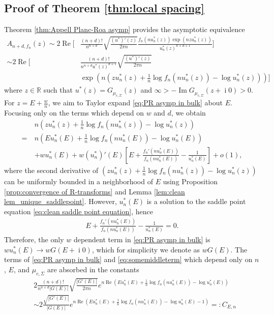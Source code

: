 \documentclass[reqno]{amsart}
\newcommand{\1}{\mathbf{1}}
\DeclareMathOperator{\ii}{i}
\renewcommand\Re{\operatorname{Re}}
\renewcommand\Im{\operatorname{Im}}
\newcommand{\R}{\mathbb{R}}
\def\R{\mathbb{R}}
\theoremstyle{plain}
\theoremstyle{definition}
\theoremstyle{remark}
\numberwithin{equation}{section}
\begin{document}
	\subsection{Proof of Theorem \ref{thm:local spacing}} Theorem \ref{thm:Appell Planc-Roa asymp} provides the asymptotic equivalence
		\begin{align}\label{eq:PR asymp in bulk}
		A_{n+d,f_n}(z)\sim 2\Re\bigg[&\frac{(n+d)!}{n^{n+d}}\sqrt{\frac{(u^*)'(z) }{2\pi n}}\frac{f_{n}\left(nu_n^*(z) \right)\exp\left(nzu_n^*(z) \right)}{u_n^*(z)^{n+d+1}}\bigg]\nonumber\\
		\sim 2\Re\bigg[&\frac{(n+d)!}{n^{n+d} u^*(z)^{d+1}}\sqrt{\frac{(u^*)'(z) }{2\pi n}}\nonumber\\
		&\exp\left(n\left(  zu_n^*(z)+\frac{1}{n}\log f_{n}(nu_n^*(z))-\log u_n^*(z) \right)\right)
		\bigg]
	\end{align}
	 where $z\in\R$ such that $u^*(z)=G_{\mu_{c,\Sigma}}(z)$ and $\infty>-\Im G_{\mu_{c,\Sigma}}(z+\ii0)>0$. For $z=E+\frac{w}{n}$, we aim to Taylor expand  \eqref{eq:PR asymp in bulk} about $E$. Focusing only on the terms which depend on $w$ and $d$,
	we obtain \begin{align}
		&n\left(  zu_n^*(z)+\frac{1}{n}\log f_{n}(nu_n^*(z))-\log u_n^*(z) \right)\nonumber \\
		=\ & n\left(Eu_n^*(E)+\frac{1}{n}\log f_{n}(nu_n^*(E))-\log u_n^*(E) \right)\label{eq:somemiddleterm} \\
		&+wu_n^*(E)+w(u_n^*)'(E)\left[E+\frac{f_n'(nu_n^*(E))}{f_n(nu_n^*(E))}-\frac{1}{u_n^*(E)}\right]+o(1),\nonumber
	\end{align} where the second derivative of $\left(zu_n^*(z)+\frac{1}{n}\log f_{n}(nu_n^*(z))-\log u_n^*(z)\right)$ can be uniformly bounded in a neighborhood of $E$ using Proposition \ref{prop:convergence of R-transforms} and Lemma \ref{lem:clean lem_unique_saddlepoint}. However, $u^*_{n}(E)$ is a solution to the saddle point equation \eqref{eq:clean saddle point equation}, hence \begin{align*}
	E+\frac{f_n'(nu_n^*(E))}{f_n(nu_n^*(E))}-\frac{1}{u_n^*(E)}=0.
	\end{align*} Therefore, the only $w$ dependent term in \eqref{eq:PR asymp in bulk} is $wu_n^*(E)\to wG(E+\ii0)$, which for simplicity we denote as $wG(E)$. The terms of \eqref{eq:PR asymp in bulk} and \eqref{eq:somemiddleterm} which depend only on $n$, $E$, and $\mu_{c,\Sigma}$ are absorbed in the constants
	\begin{align}
		 &2\frac{(n+d)!}{n^{n+d} |G(E)|}\sqrt{\frac{|G'(E)| }{2\pi n}}e ^{  n\Re\left(Eu_n^*(E)+\frac{1}{n}\log f_{n}(nu_n^*(E))-\log u_n^*(E) \right)}\nonumber \\
		 &\sim2\frac{\sqrt{ |G'(E)| }}{ |G(E)|}e ^{  n\Re\left(Eu_n^*(E)+\frac{1}{n}\log f_{n}(nu_n^*(E))-\log u_n^*(E) -1\right)}=:C_{E,n}\label{eq:CEn}
		\end{align}
\end{document}
